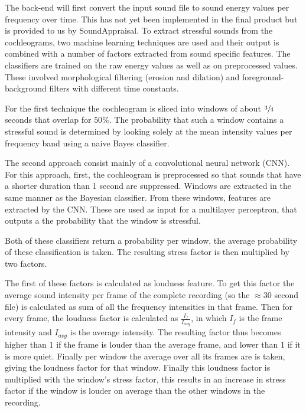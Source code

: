 The back-end will first convert the input sound file to sound energy values per frequency over time. This has not yet been implemented in the final product but is provided to us by SoundAppraisal. To extract stressful sounds from the cochleograms, two machine learning techniques are used and their output is combined with a number of factors extracted from sound specific features.
The classifiers are trained on the raw energy values as well as on preprocessed values. These involved morphological filtering (erosion and dilation) and foreground-background filters with different time constants.

For the first technique the cochleogram is sliced into windows of about $\sfrac{3}{4}$ seconds that overlap for $50\%$. The probability that such a window contains a stressful sound is determined by looking solely at the mean intensity values per frequency band using a naive Bayes classifier.  

The second approach consist mainly of a convolutional neural network (CNN). For this approach, first, the cochleogram is preprocessed so that sounds that have a shorter duration than 1 second are suppressed. Windows are extracted in the same manner as the Bayesian classifier. From these windows, features are extracted by the CNN. These are used as input for a multilayer perceptron, that outputs a the probability that the window is stressful. 

Both of these classifiers return a probability per window, the average probability of these classification is taken. The resulting stress factor is then multiplied by two factors.

The first of these factors is calculated as loudness feature. To get this factor the average sound intensity per frame of the complete recording (so the $\approx$30 second file) is calculated as sum of all the frequency intensities in that frame. Then for every frame, the loudness factor is calculated as $\frac{I_f}{I_{avg}}$, in which $I_f$ is the frame intensity and $I_{avg}$ is the average intensity. The resulting factor thus becomes higher than 1 if the frame is louder than the average frame, and lower than 1 if it is more quiet. Finally per window the average over all its frames are is taken, giving the loudness factor for that window. %
Finally this loudness factor is multiplied with the window's stress factor, this results in an increase in stress factor if the window is louder on average than the other windows in the recording.

